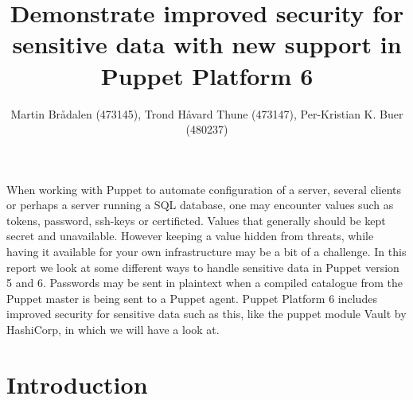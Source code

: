 \usepackage{listings}



\title{Demonstrate improved security for sensitive data with new support in Puppet Platform 6}
\author{Martin Brådalen (473145), Trond Håvard Thune (473147), Per-Kristian K. Buer (480237)}



\maketitle

\abstract 
When working with Puppet to automate configuration of a server, several clients or perhaps a server running a SQL database, one may encounter values such as tokens, password, ssh-keys or certificted. Values that generally should be kept secret and unavailable. However keeping a value hidden from threats, while having it available for your own infrastructure may be a bit of a challenge. In this report we look at some different ways to handle sensitive data in Puppet version 5 and 6. Passwords may be sent in plaintext when a compiled catalogue from the Puppet master is being sent to a Puppet agent.
Puppet Platform 6 includes improved security for sensitive data such as this, like the puppet module Vault by HashiCorp, in which we will have a look at.


\thispagestyle{empty}

\clearpage
{}
\setcounter{page}{1}
\tableofcontents

\clearpage
{}

\section{Introduction}

